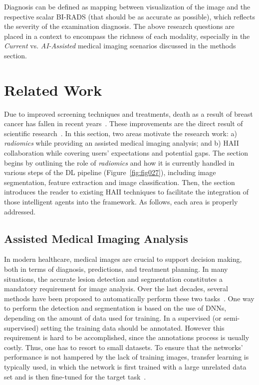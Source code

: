 \hfill

Diagnosis can be defined as mapping between visualization of the image and the respective scalar BI-RADS (that should be as accurate as possible), which reflects the severity of the examination diagnosis.
The above research questions are placed in a context to encompass the  richness of each modality, especially in the {\it Current} vs. {\it AI-Assisted} medical imaging scenarios discussed in the methods section.

\section{Related Work}
\label{sec:sec005002}

Due to improved screening techniques and treatments, death as a result of breast cancer has fallen in recent years~\cite{doi:10.3322/caac.21492, doi:10.1002/cncr.32859}.
These improvements are the direct result of scientific research~\cite{AGRAWAL201927, murtaza2019deep}.
In this section, two areas motivate the research work: a) {\it radiomics} while providing an assisted medical imaging analysis; and b) \ac{HAII} collaboration while covering users' expectations and potential gaps.
The section begins by outlining the role of {\it radiomics} and how it is currently handled in various steps of the \ac{DL} pipeline (Figure~\ref{fig:fig027}), including image segmentation, feature extraction and image classification.
Then, the section introduces the reader to existing \ac{HAII} techniques to facilitate the integration of those intelligent agents into the framework.
As follows, each area is properly addressed.

\subsection{Assisted Medical Imaging Analysis}
\label{sec:sec005002001}

In modern healthcare, medical images are crucial to support decision making, both in terms of diagnosis, predictions, and treatment planning.
In many situations, the accurate lesion detection and segmentation constitutes a mandatory requirement for image analysis. 
Over the last decades, several methods have been proposed to automatically perform these two tasks~\cite{litjens2017survey}.
One way to perform the detection and segmentation is based on the use of \acp{DNN}, depending on the amount of data used for training.
In a supervised (or semi-supervised) setting the training data should be annotated. However this requirement is hard to be accomplished, since the annotations process is usually costly. Thus,  one has to resort to small datasets.
To ensure that the networks' performance is not hampered by the lack of training images, transfer learning is typically used, in which the network is first trained with a large unrelated data set and is then fine-tuned for the target task~\cite{shin2016deep}.

